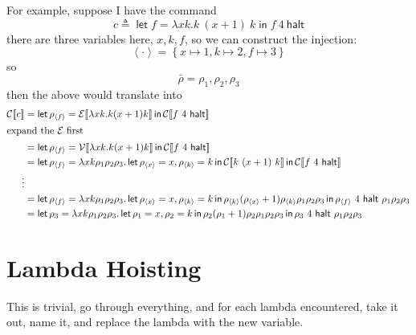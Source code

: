 \documentclass[11pt,a4paper]{article}
\newcommand {\coo} [1] {\ensuremath{\operatorname{\mathsf{#1}}}}
\newcommand{\Let}[1]{\coo{let} #1 \coo{in} }
\newcommand{\Rec}[1]{\left\{#1\right\}}
\newcommand{\ba}[1]{\left\langle #1\right\rangle}
\newcommand{\g}[1]{\textsf{#1}}
\newcommand{\trans}[2]{\ensuremath{\mathcal{#1}\llbracket #2\rrbracket}}
\begin{document}
\begin{enumerate}[label=\textbf{Excercise \arabic*\ }]
\begin{enumerate}
For example, suppose I have the command 
$$
c \triangleq \Let{f = \lambda xk. k~ (x + 1)~k}{f~4~\g{halt}}
$$
there are three variables here, $x,k,f$, so we can construct the injection:
$$
\ba{\cdot} = \Rec{x \mapsto 1, k \mapsto 2, f \mapsto 3}
$$
so
$$
\bar\rho = \rho_1, \rho_2, \rho_3
$$
then the above would translate into
\begin{align*}
\trans{C}{c} &= \Let{\rho_{\ba{f}} = \trans{E}{\lambda xk. k (x + 1)k}}{\trans{C}{f~4~\g{halt}}} \\
\intertext{expand the $\mathcal{E}$ first}
&= \Let{\rho_{\ba{f}} = \trans{V}{\lambda xk. k (x + 1)k}}{\trans{C}{f~4~\g{halt}}} \\
&= \Let{\rho_{\ba{f}} = \lambda xk\rho_1\rho_2\rho_3.\Let{\rho_{\ba{x}} = x,\rho_{\ba{k}} = k}{\trans{C}{k~(x + 1)~k}}}{\trans{C}{f~4~\g{halt}}} \\
\vdots \\
&= \Let{\rho_{\ba{f}} = \lambda xk\rho_1\rho_2\rho_3.\Let{\rho_{\ba{x}} = x,\rho_{\ba{k}} = k}{\rho_{\ba{k}}(\rho_{\ba{x}} + 1)\rho_{\ba{k}}\rho_1\rho_2\rho_3}}{{\rho_{\ba{f}}~4~\g{halt}~\rho_1\rho_2\rho_3}} \\
&=\Let{\rho_{3} = \lambda xk\rho_1\rho_2\rho_3.\Let{\rho_{1} = x,\rho_{2} = k}{\rho_{2}(\rho_{1} + 1)\rho_{2}\rho_1\rho_2\rho_3}}{{\rho_{3}~4~\g{halt}~\rho_1\rho_2\rho_3}}
\end{align*}
\section*{Lambda Hoisting}
This is trivial, go through everything, and for each lambda encountered, take it out, name it, and replace the lambda with the new variable.

\end{enumerate}
\end{enumerate}
\end{document}
